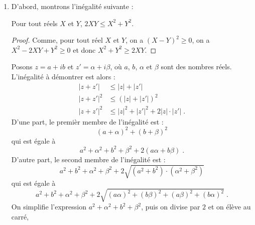 \begin{corrige}
\begin{dem}
\begin{enumerate}
	      \item D'abord, montrons l'in\'egalit\'e suivante :
		            \begin{lem}
		                  \label{lem: inegalite x**2 + y**2 >= 2xy}
	                        Pour tout r\'eels $X$ et $Y$, $2 X Y \leq X^2 + Y^2$.
	      	            \end{lem}
	      	            \begin{proof}
	      	                  Comme, pour tout r\'eel $X$ et $Y$, on a $(X - Y)^2 \geq 0$, on a 
	      	                  $X^2 - 2 X Y + Y^2 \geq 0$ et donc $X^2 + Y^2 \geq 2 X Y $.
	      	            \end{proof}
	      	      Posons $z = a + i b$ et $z' = \alpha + i \beta$, o\`u $a$, $b$, $\alpha$ et $\beta$ sont des nombres r\'eels.
	      	      L'in\'egalit\'e \`a d\'emontrer est alors :
	            \begin{align*}
	                  |z + z'|                   
	                        & \leq 
	                              |z| + |z'|                                                                       \\
	                  |z + z'|^2                 
	                        & \leq 
	                              (|z| + |z'|)^2                                                                   \\
	                  |z + z'|^2                 
	                        & \leq 
	                              |z|^2 + |z'|^2 + 2 |z|\cdot |z'|                                                 \;.
	            \end{align*}
	            D'une part, le premi\`er membre de l'in\'egalit\'e est : 
	                  \[
	                  (a+\alpha)^2 + (b+\beta)^2 
	                  \]
	            qui est \'egale \`a 
	                  \[
	                  a^2+\alpha^2+b^2+\beta^2+2(a\alpha+b\beta)                                                   \;.
	                  \]
	            D'autre part, le second membre de l'in\'egalit\'e est :
	                  \[
	                        a^2 +b^2 + \alpha^2 + \beta^2 + 2 \sqrt{(a^2+b^2)\cdot(\alpha^2+\beta^2)}
	                  \]
      	            qui est \'egale \`a 
	                  \[
	                        a^2+b^2+\alpha^2+\beta^2+2\sqrt{(a\alpha)^2+(b\beta)^2+(a\beta)^2+(b\alpha)^2}         \;.
	                  \]
                  On simplifie l'expression $ a^2+\alpha^2+b^2+\beta^2 $, puis on divise par $2$ et on \'el\`eve au carr\'e,

\end{enumerate}
\end{dem}
\end{corrige}

